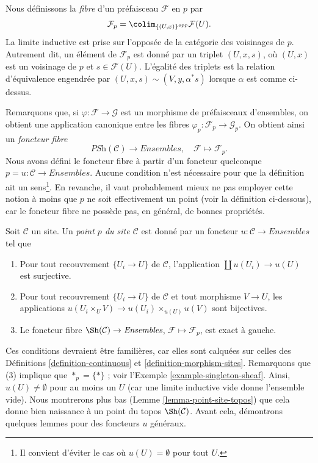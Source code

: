 \medskip\noindent
Nous définissons la {\it fibre} d’un préfaisceau $\mathcal{F}$ en $p$ par
\begin{equation}
\label{equation-stalk}
\mathcal{F}_p = \colim_{\{(U, x)\}^{opp}} \mathcal{F}(U).
\end{equation}
La limite inductive est prise sur l’opposée de la catégorie des
voisinages de $p$. Autrement dit, un élément de $\mathcal{F}_p$ est donné par
un triplet $(U, x, s)$, où $(U, x)$ est un voisinage de $p$ et
$s \in \mathcal{F}(U)$. L’égalité des triplets est la relation d’équivalence
engendrée par $(U, x, s) \sim (V, y, \alpha^*s)$ lorsque $\alpha$ est comme
ci-dessus.

\medskip\noindent
Remarquons que, si $\varphi : \mathcal{F} \to \mathcal{G}$ est un morphisme
de préfaisceaux d’ensembles, on obtient une application canonique entre les
fibres $\varphi_p : \mathcal{F}_p \to \mathcal{G}_p$. On obtient ainsi un
{\it foncteur fibre}
$$
\textit{PSh}(\mathcal{C}) \longrightarrow \textit{Ensembles}, \quad
\mathcal{F} \longmapsto \mathcal{F}_p.
$$
Nous avons défini le foncteur fibre à partir d’un foncteur quelconque
$p = u : \mathcal{C} \to \textit{Ensembles}$. Aucune condition n’est nécessaire
pour que la définition ait un sens\footnote{Il convient d’éviter le cas où
$u(U) = \emptyset$ pour tout $U$.}. En revanche, il vaut probablement mieux
ne pas employer cette notion à moins que $p$ ne soit effectivement un point
(voir la définition ci-dessous), car le foncteur fibre ne possède pas, en
général, de bonnes propriétés.

\begin{definition}
\label{definition-point}
Soit $\mathcal{C}$ un site. Un {\it point $p$ du site $\mathcal{C}$} est donné
par un foncteur $u : \mathcal{C} \to \textit{Ensembles}$ tel que
\begin{enumerate}
\item Pour tout recouvrement $\{U_i \to U\}$ de $\mathcal{C}$, l’application
$\coprod u(U_i) \to u(U)$ est surjective.
\item Pour tout recouvrement $\{U_i \to U\}$ de $\mathcal{C}$ et tout
morphisme $V \to U$, les applications
$u(U_i \times_U V) \to u(U_i) \times_{u(U)} u(V)$ sont bijectives.
\item Le foncteur fibre $\Sh(\mathcal{C}) \to \textit{Ensembles}$,
$\mathcal{F} \mapsto \mathcal{F}_p$, est exact à gauche.
\end{enumerate}
\end{definition}

\noindent
Ces conditions devraient être familières, car elles sont calquées sur celles
des Définitions \ref{definition-continuous} et
\ref{definition-morphism-sites}.
Remarquons que (3) implique que $*_p = \{*\}$ ; voir
l’Exemple \ref{example-singleton-sheaf}. Ainsi,
$u(U) \not = \emptyset$ pour au moins un $U$ (car une limite inductive vide
donne l’ensemble vide). Nous montrerons plus bas
(Lemme \ref{lemma-point-site-topos}) que cela donne bien naissance à un point
du topos $\Sh(\mathcal{C})$.
Avant cela, démontrons quelques lemmes pour des foncteurs $u$ généraux.

